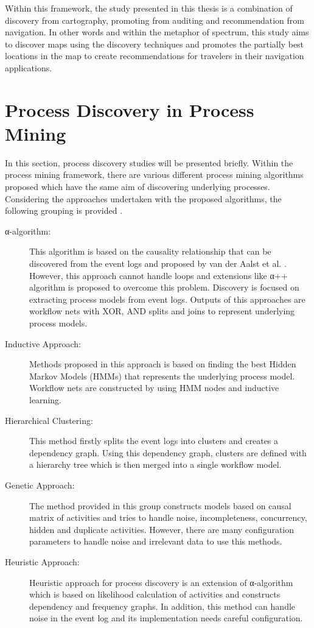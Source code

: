 Within this framework, the study presented in this thesis is a combination of discovery from cartography, promoting from auditing and recommendation from navigation. In other words and within the metaphor of spectrum, this study aims to discover maps using the discovery techniques and promotes the partially best locations in the map to create recommendations for travelers in their navigation applications. 

\section{Process Discovery in Process Mining}
\label{sec:process-discovery-in-process-mining} 
In this section, process discovery studies will be presented briefly. Within the process mining framework, there are various different process mining algorithms proposed which have the same aim of discovering underlying processes. Considering the approaches undertaken with the proposed algorithms, the following grouping is provided \cite{khodabandelou2013process}.

\begin{description}
\item[α-algorithm:] This algorithm is based on the causality relationship that can be discovered from the event logs and proposed by van der Aalst et al. \cite{van2004workflow}. However, this approach cannot handle loops and extensions like α++ algorithm \cite{de2004process} is proposed to overcome this problem. Discovery is focused on extracting process models from event logs. Outputs of this approaches are workflow nets with XOR, AND splits and joins to represent underlying process models.
\item[Inductive Approach:] Methods proposed in this approach \cite{herbst1998integrating} \cite{herbst2000dealing} is based on finding the best Hidden Markov Models (HMMs) that represents the underlying process model. Workflow nets are constructed by using HMM nodes and inductive learning.
\item[Hierarchical Clustering:] This method \cite{greco2005mining} firstly splits the event logs into clusters and creates a dependency graph. Using this dependency graph, clusters are defined with a hierarchy tree which is then merged into a single workflow model.
\item[Genetic Approach:] The method provided in this group \cite{van2005genetic} constructs models based on causal matrix of activities and tries to handle noise, incompleteness, concurrency, hidden and duplicate activities. However, there are many configuration parameters to handle noise and irrelevant data to use this methods. 
\item[Heuristic Approach:]Heuristic approach for process discovery is an extension of α-algorithm which is based on likelihood calculation of activities and constructs dependency and frequency graphs. In addition, this method can handle noise in the event log and its implementation needs careful configuration.
\end{description}
 
